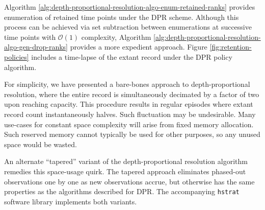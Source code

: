 Algorithm \ref{alg:depth-proportional-resolution-algo-enum-retained-ranks} provides enumeration of retained time points under the DPR scheme.
Although this process can be achieved via set subtraction between enumerations at successive time points with $\mathcal{O}(1)$ complexity, Algorithm \ref{alg:depth-proportional-resolution-algo-gen-drop-ranks} provides a more expedient approach.
Figure \ref{fig:retention-policies} includes a time-lapse of the extant record under the DPR policy algorithm.

For simplicity, we have presented a bare-bones approach to depth-proportional resolution, where the entire record is simultaneously decimated by a factor of two upon reaching capacity.
This procedure results in regular episodes where extant record count instantaneously halves.
Such fluctuation may be undesirable.
Many use-cases for constant space complexity will arise from fixed memory allocation.
Such reserved memory cannot typically be used for other purposes, so any unused space would be wasted.

An alternate ``tapered'' variant of the depth-proportional resolution algorithm remedies this space-usage quirk.
The tapered approach eliminates phased-out observations one by one as new observations accrue, but otherwise has the same properties as the algorithms described for DPR.
The accompanying \texttt{hstrat} software library implements both variants.



% 
% 
